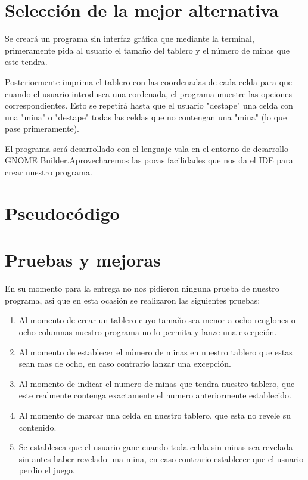 \documentclass[15pt, letterpaper]{article}
\begin{document}
\section{Selección de la mejor alternativa}
Se creará un programa sin interfaz gráfica que mediante la terminal, primeramente pida al usuario el tamaño del tablero y el número de minas que este tendra.\newline

Posteriormente imprima el tablero con las coordenadas de cada celda para que cuando el usuario introdusca una cordenada, el programa muestre las opciones correspondientes. Esto se repetirá hasta que el usuario "destape" una celda con una "mina" o "destape" todas las celdas que no contengan una "mina" (lo que pase primeramente). \newline

El programa será desarrollado con el lenguaje vala en el entorno de desarrollo GNOME Builder.\newline Aprovecharemos las pocas facilidades que nos da el IDE para crear nuestro programa.

\section{Pseudocódigo}

\section{Pruebas y mejoras}
En su momento para la entrega no nos pidieron ninguna prueba de nuestro programa, asi que en esta ocasión se realizaron las siguientes pruebas: 

\begin{enumerate}
\item Al momento de crear un tablero cuyo tamaño sea menor a ocho renglones o ocho columnas nuestro programa no lo permita y lanze una excepción.
\item Al momento de establecer el número de minas en nuestro tablero que estas sean mas de ocho, en caso contrario lanzar una excepción.
\item Al momento de indicar el numero de minas que tendra nuestro tablero, que este realmente contenga exactamente el numero anteriormente establecido.
\item Al momento de marcar una celda en nuestro tablero, que esta no revele su contenido.
\item Se establesca que el usuario gane cuando toda celda sin minas sea revelada sin antes haber revelado una mina, en caso contrario establecer que el usuario perdio el juego.

\end{enumerate}
\end{document}
